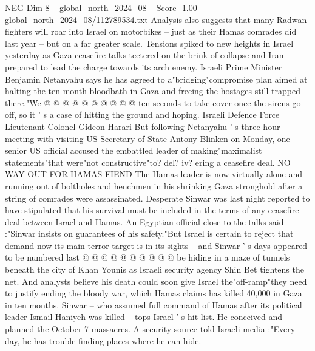 \begin{textsample}{NEG Dim 8 – global\_north\_2024\_08 – Score -1.00 – global\_north\_2024\_08/112789534.txt}
Analysis also suggests that many Radwan fighters will roar into Israel on motorbikes -- just as their Hamas comrades did last year -- but on a far greater scale.
Tensions spiked to new heights in Israel yesterday as Gaza ceasefire talks teetered on the brink of collapse and Iran prepared to lead the charge towards its arch enemy.
Israeli Prime Minister Benjamin Netanyahu says he has agreed to a"bridging"compromise plan aimed at halting the ten-month bloodbath in Gaza and freeing the hostages still trapped there."We @ @ @ @ @ @ @ @ @ @ ten seconds to take cover once the sirens go off, so it ' s a case of hitting the ground and hoping.
Israeli Defence Force Lieutenant Colonel Gideon Harari But following Netanyahu ' s three-hour meeting with visiting US Secretary of State Antony Blinken on Monday, one senior US official accused the embattled leader of making"maximalist statements"that were"not constructive"to? del? iv? ering a ceasefire deal.
NO WAY OUT FOR HAMAS FIEND The Hamas leader is now virtually alone and running out of boltholes and henchmen in his shrinking Gaza stronghold after a string of comrades were assassinated.
Desperate Sinwar was last night reported to have stipulated that his survival must be included in the terms of any ceasefire deal between Israel and Hamas.
An Egyptian official close to the talks said :"Sinwar insists on guarantees of his safety."But Israel is certain to reject that demand now its main terror target is in its sights -- and Sinwar ' s days appeared to be numbered last @ @ @ @ @ @ @ @ @ @ be hiding in a maze of tunnels beneath the city of Khan Younis as Israeli security agency Shin Bet tightens the net.
And analysts believe his death could soon give Israel the"off-ramp"they need to justify ending the bloody war, which Hamas claims has killed 40,000 in Gaza in ten months.
Sinwar -- who assumed full command of Hamas after its political leader Ismail Haniyeh was killed -- tops Israel ' s hit list.
He conceived and planned the October 7 massacres.
A security source told Israeli media :"Every day, he has trouble finding places where he can hide.

\end{textsample}
